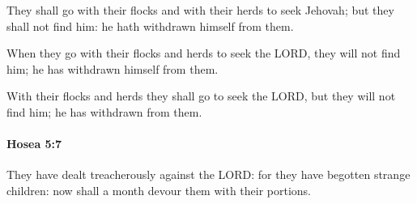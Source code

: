 			\begin{versebox}
					\item[BHS] 
					\item[LXX] 
					\item[ASV] They shall go with their flocks and with their herds to seek Jehovah; but they shall not find him: he hath withdrawn himself from them.
					\item[NIV] When they go with their flocks and herds to seek the LORD, they will not find him; he has withdrawn himself from them.
					\item[NRSV] With their flocks and herds they shall go to seek the LORD, but they will not find him; he has withdrawn from them.
			\end{versebox}

		\paragraph{Hosea 5:7} %
			\label{HOSEA-5-7}

			They have dealt treacherously against the LORD: for they have begotten strange children: now shall a month devour them with their portions.

